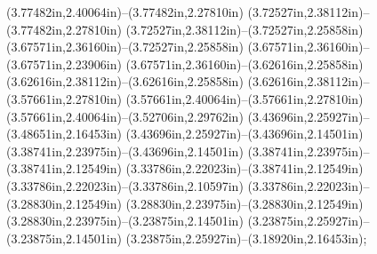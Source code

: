 (3.77482in,2.40064in)--(3.77482in,2.27810in) (3.72527in,2.38112in)--(3.77482in,2.27810in) (3.72527in,2.38112in)--(3.72527in,2.25858in) (3.67571in,2.36160in)--(3.72527in,2.25858in) (3.67571in,2.36160in)--(3.67571in,2.23906in) (3.67571in,2.36160in)--(3.62616in,2.25858in) (3.62616in,2.38112in)--(3.62616in,2.25858in) (3.62616in,2.38112in)--(3.57661in,2.27810in) (3.57661in,2.40064in)--(3.57661in,2.27810in) (3.57661in,2.40064in)--(3.52706in,2.29762in) (3.43696in,2.25927in)--(3.48651in,2.16453in) (3.43696in,2.25927in)--(3.43696in,2.14501in) (3.38741in,2.23975in)--(3.43696in,2.14501in) (3.38741in,2.23975in)--(3.38741in,2.12549in) (3.33786in,2.22023in)--(3.38741in,2.12549in) (3.33786in,2.22023in)--(3.33786in,2.10597in) (3.33786in,2.22023in)--(3.28830in,2.12549in) (3.28830in,2.23975in)--(3.28830in,2.12549in) (3.28830in,2.23975in)--(3.23875in,2.14501in) (3.23875in,2.25927in)--(3.23875in,2.14501in) (3.23875in,2.25927in)--(3.18920in,2.16453in);
